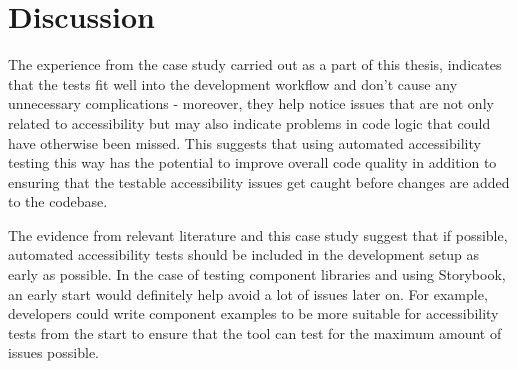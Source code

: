 \documentclass{master_thesis}
\begin{document}
\section{Discussion} \label{chap:conclusions}

The experience from the case study carried out as a part of this thesis, indicates that the tests fit well into the development workflow and don't cause any unnecessary complications - moreover, they help notice issues that are not only related to accessibility but may also indicate problems in code logic that could have otherwise been missed. This suggests that using automated accessibility testing this way has the potential to improve overall code quality in addition to ensuring that the testable accessibility issues get caught before changes are added to the codebase.

The evidence from relevant literature and this case study suggest that if possible, automated accessibility tests should be included in the development setup as early as possible. In the case of testing component libraries and using Storybook, an early start would definitely help avoid a lot of issues later on. For example, developers could write component examples to be more suitable for accessibility tests from the start to ensure that the tool can test for the maximum amount of issues possible.




\end{document}
